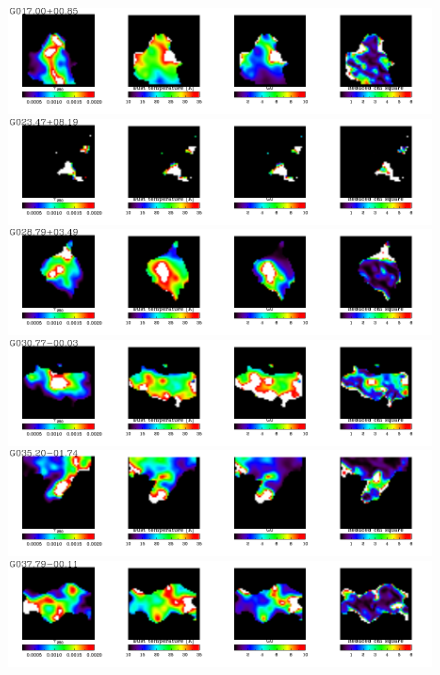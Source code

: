   \begin{figure}
\centering
\includegraphics[trim=0 2mm 0 0, clip, width=190mm]{appA/appA_6.pdf}  
\includegraphics[trim=0 2mm 0 0, clip, width=190mm]{appA/appA_7.pdf}
\includegraphics[trim=0 2mm 0 0, clip, width=190mm]{appA/appA_8.pdf}
\includegraphics[trim=0 2mm 0 0, clip, width=190mm]{appA/appA_9.pdf}
\includegraphics[trim=0 2mm 0 0, clip, width=190mm]{appA/appA_10.pdf}
\includegraphics[trim=0 2mm 0 0, clip, width=190mm]{appA/appA_11.pdf}
  \end{figure}
  
